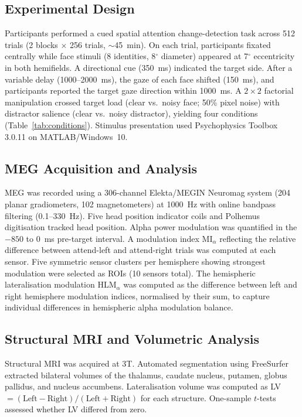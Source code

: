 \documentclass[11pt]{article}
\begin{document}
\subsection{Experimental Design}

Participants performed a cued spatial attention change-detection task across 512 trials (2 blocks $\times$ 256 trials, $\sim$45~min). On each trial, participants fixated centrally while face stimuli (8 identities, 8$^\circ$ diameter) appeared at 7$^\circ$ eccentricity in both hemifields. A directional cue (350~ms) indicated the target side. After a variable delay (1000--2000~ms), the gaze of each face shifted (150~ms), and participants reported the target gaze direction within 1000~ms. A $2 \times 2$ factorial manipulation crossed target load (clear vs.\ noisy face; 50\% pixel noise) with distractor salience (clear vs.\ noisy distractor), yielding four conditions (Table~\ref{tab:conditions}). Stimulus presentation used Psychophysics Toolbox 3.0.11 \citep{brainard1997psychophysics} on MATLAB/Windows~10.

\subsection{MEG Acquisition and Analysis}

MEG was recorded using a 306-channel Elekta/MEGIN Neuromag system (204 planar gradiometers, 102 magnetometers) at 1000~Hz with online bandpass filtering (0.1--330~Hz). Five head position indicator coils and Polhemus digitisation tracked head position. Alpha power modulation was quantified in the $-850$ to $0$~ms pre-target interval. A modulation index MI$_\alpha$ reflecting the relative difference between attend-left and attend-right trials was computed at each sensor. Five symmetric sensor clusters per hemisphere showing strongest modulation were selected as ROIs (10 sensors total). The hemispheric lateralisation modulation HLM$_\alpha$ was computed as the difference between left and right hemisphere modulation indices, normalised by their sum, to capture individual differences in hemispheric alpha modulation balance.

\subsection{Structural MRI and Volumetric Analysis}

Structural MRI was acquired at 3T. Automated segmentation using FreeSurfer \citep{fischl2002whole} extracted bilateral volumes of the thalamus, caudate nucleus, putamen, globus pallidus, and nucleus accumbens. Lateralisation volume was computed as LV $= (\text{Left} - \text{Right}) / (\text{Left} + \text{Right})$ for each structure. One-sample $t$-tests assessed whether LV differed from zero.
\end{document}
